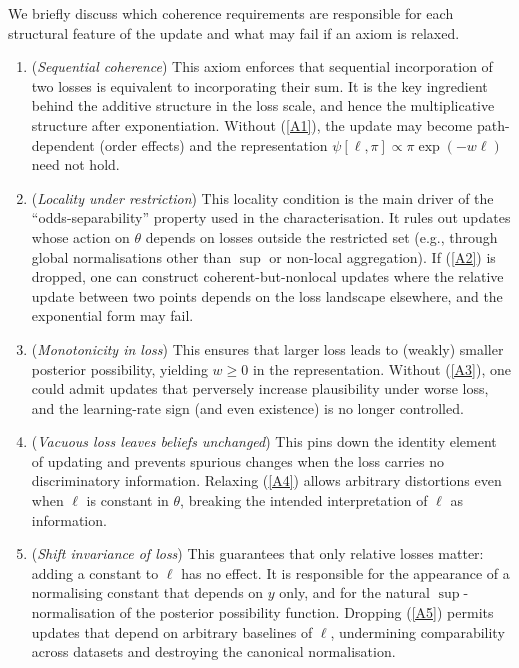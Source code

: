 \documentclass[accepted]{uai2026} %
\theoremstyle{remark}
\begin{document}
We briefly discuss which coherence requirements are responsible for each structural feature of the update and what may fail if an axiom is relaxed.
\begin{enumerate}[label=A2.\arabic*,leftmargin=25pt,wide]
%
\item (\emph{Sequential coherence}) This axiom enforces that sequential incorporation of two losses is equivalent to incorporating their sum. It is the key ingredient behind the additive structure in the loss scale, and hence the multiplicative structure after exponentiation. Without (\ref{A1}), the update may become path-dependent (order effects) and the representation $\psi[\ell,\pi]\propto \pi\exp(-w\ell)$ need not hold.
%
\item (\emph{Locality under restriction}) This locality condition is the main driver of the ``odds-separability'' property used in the characterisation. It rules out updates whose action on $\theta$ depends on losses outside the restricted set (e.g., through global normalisations other than $\sup$ or non-local aggregation). If (\ref{A2}) is dropped, one can construct coherent-but-nonlocal updates where the relative update between two points depends on the loss landscape elsewhere, and the exponential form may fail.
%
\item (\emph{Monotonicity in loss}) This ensures that larger loss leads to (weakly) smaller posterior possibility, yielding $w\ge 0$ in the representation. Without (\ref{A3}), one could admit updates that perversely increase plausibility under worse loss, and the learning-rate sign (and even existence) is no longer controlled.
%
\item (\emph{Vacuous loss leaves beliefs unchanged}) This pins down the identity element of updating and prevents spurious changes when the loss carries no discriminatory information. Relaxing (\ref{A4}) allows arbitrary distortions even when $\ell$ is constant in $\theta$, breaking the intended interpretation of $\ell$ as information.
%
\item (\emph{Shift invariance of loss}) This guarantees that only relative losses matter: adding a constant to $\ell$ has no effect. It is responsible for the appearance of a normalising constant that depends on $y$ only, and for the natural $\sup$-normalisation of the posterior possibility function. Dropping (\ref{A5}) permits updates that depend on arbitrary baselines of $\ell$, undermining comparability across datasets and destroying the canonical normalisation.
\end{enumerate}
\end{document}
